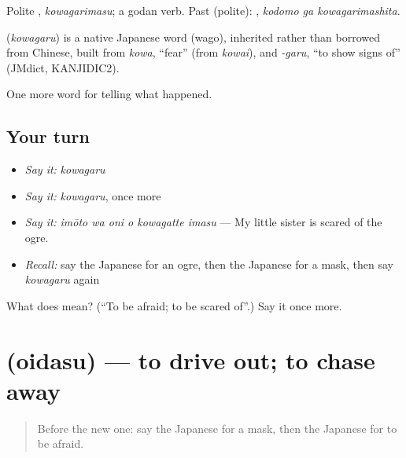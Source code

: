 Polite \textbf{}, \emph{kowagarimasu}; a godan verb. Past (polite): \textbf{ }, \emph{kodomo ga kowagarimashita}.

\begin{cousinweb}
\textbf{} (\emph{kowagaru}) is a native Japanese word (wago), inherited rather than borrowed from Chinese, built from \emph{kowa}, \textquotedblleft{}fear\textquotedblright{} (from \emph{kowai}), and \emph{-garu}, \textquotedblleft{}to show signs of\textquotedblright{} (JMdict, KANJIDIC2).
\end{cousinweb}

\begin{grammarlens}[title={What you've built}]
One more word for telling what happened.
\end{grammarlens}

\subsection*{Your turn}
\begin{itemize}
\raggedright
  \item \emph{Say it:} \emph{kowagaru}
  \item \emph{Say it:} \emph{kowagaru}, once more
  \item \emph{Say it:} \emph{imōto wa oni o kowagatte imasu} — My little sister is scared of the ogre.
  \item \emph{Recall:} say the Japanese for an ogre, then the Japanese for a mask, then say \emph{kowagaru} again
\end{itemize}

\begin{tcolorbox}[breakable,colback=teal!4,colframe=teal!35!black,title={Before you move on}]
What does  mean? (\textquotedblleft{}To be afraid; to be scared of\textquotedblright{}.) Say it once more.
\end{tcolorbox}
\section[\texorpdfstring{\ja{おいだす} (oidasu)}{おいだす (oidasu)}]{ (oidasu) — to drive out; to chase away}

\label{lesson:JA-C297-oidasu}



\begin{quote}
Before the new one: say the Japanese for a mask, then the Japanese for to be afraid.
\end{quote}

